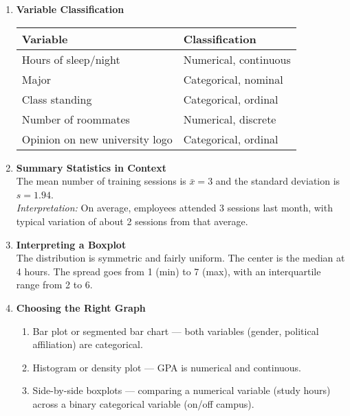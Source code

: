 \documentclass{article}
\begin{document}
\begin{enumerate}

  \item \textbf{Variable Classification}  
  \begin{center}
  \begin{tabular}{|l|l|}
  \hline
  \textbf{Variable} & \textbf{Classification} \\
  \hline
  Hours of sleep/night & Numerical, continuous \\
  Major & Categorical, nominal \\
  Class standing & Categorical, ordinal \\
  Number of roommates & Numerical, discrete \\
  Opinion on new university logo & Categorical, ordinal \\
  \hline
  \end{tabular}
  \end{center}

  \item \textbf{Summary Statistics in Context} \\
  The mean number of training sessions is $\bar{x} = 3$ and the standard deviation is $s = 1.94$. \\
  \textit{Interpretation:} On average, employees attended 3 sessions last month, with typical variation of about 2 sessions from that average.

  \item \textbf{Interpreting a Boxplot} \\
  The distribution is symmetric and fairly uniform. The center is the median at 4 hours. The spread goes from 1 (min) to 7 (max), with an interquartile range from 2 to 6.

  \item \textbf{Choosing the Right Graph}
  \begin{enumerate}
    \item Bar plot or segmented bar chart — both variables (gender, political affiliation) are categorical.
    \item Histogram or density plot — GPA is numerical and continuous.
    \item Side-by-side boxplots — comparing a numerical variable (study hours) across a binary categorical variable (on/off campus).
  \end{enumerate}


\end{enumerate}
\end{document}
